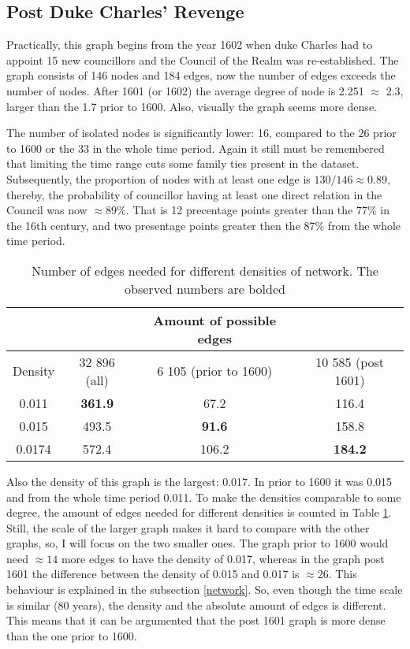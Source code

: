 \subsection{Post Duke Charles' Revenge}
Practically, this graph begins from the year 1602 when duke Charles had to appoint 15 new councillors and the Council of the Realm was re-established. The graph consists of 146 nodes and 184 edges, now the number of edges exceeds the number of nodes. After 1601 (or 1602) the average degree of node is 2.251 $\approx$ 2.3, larger than the 1.7 prior to 1600. Also, visually the graph seems more dense. 

The number of isolated nodes is significantly lower: 16, compared to the 26 prior to 1600 or the 33 in the whole time period. Again it still must be remembered that limiting the time range cuts some family ties present in the dataset. Subsequently, the proportion of nodes with at least one edge is $130/146 \approx 0.89$, thereby, the probability of councillor having at least one direct relation in the Council was now $\approx 89\%$. That is 12 precentage points greater than the 77\% in the 16th century, and two presentage points greater then the 87\% from the whole time period.

\begin{table}
	\caption[Number of edges needed for different densities of network]{Number of edges needed for different densities of network. The observed numbers are bolded}
	\label{edges}
	\begin{tabular}{cccc}
		\hline
		&& Amount of possible edges & \\
		\hline
		Density & 32 896 (all) & 6 105 (prior to 1600) & 10 585 (post 1601) \\
		\hline 
		0.011 & \textbf{361.9} & 67.2 & 116.4 \\
		\hline
		0.015 & 493.5 & \textbf{91.6} & 158.8 \\
		\hline
		0.0174 & 572.4 & 106.2 & \textbf{184.2}\\
		\hline
	\end{tabular}
\end{table}

Also the density of this graph is the largest: 0.017. In prior to 1600 it was 0.015 and from the whole time period 0.011. To make the densities comparable to some degree, the amount of edges needed for different densities is counted in Table \ref{edges}. Still, the scale of the larger graph makes it hard to compare with the other graphs, so, I will focus on the two smaller ones. The graph prior to 1600 would need $\approx 14$ more edges to have the density of 0.017, whereas in the graph post 1601 the difference between the density of 0.015 and 0.017 is $\approx 26$. This behaviour is explained in the subsection \ref{network}. So, even though the time scale is similar (80 years), the density and the absolute amount of edges is different. This means that it can be argumented that the post 1601 graph is more dense than the one prior to 1600. 
 
